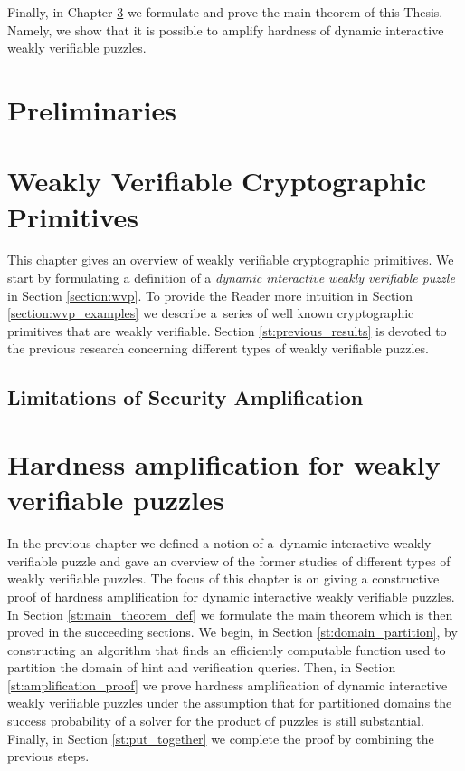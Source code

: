 \documentclass[11pt,a4paper,titlepage]{memoir}
\begin{document}
Finally, in Chapter \ref{ch:main_result} we formulate and prove the main theorem of this Thesis.
Namely, we show that it is possible to amplify hardness of dynamic interactive weakly verifiable puzzles.
%
\chapter{Preliminaries}
\label{ch:preliminaries}


\chapter{Weakly Verifiable Cryptographic Primitives}
\label{ch:intro_weakly}
This chapter gives an overview of weakly verifiable cryptographic primitives.
We start by formulating a definition of a \textit{dynamic interactive weakly verifiable puzzle} in Section \ref{section:wvp}.
To provide the Reader more intuition in Section \ref{section:wvp_examples} we describe a~series of well known cryptographic primitives
that are weakly verifiable. Section \ref{st:previous_results} is devoted to the previous research concerning different types of weakly verifiable puzzles.
%



%
\section{Limitations of Security Amplification}
%
\chapter{Hardness amplification for weakly verifiable puzzles}
\label{ch:main_result}
In the previous chapter we defined a notion of a~dynamic interactive weakly verifiable puzzle
and gave an overview of the former studies of different types of weakly verifiable puzzles.
The focus of this chapter is on giving a constructive proof of hardness amplification for dynamic interactive weakly verifiable puzzles.
In Section \ref{st:main_theorem_def} we formulate the main theorem which is then proved in the succeeding sections.
We begin, in Section \ref{st:domain_partition}, by constructing an algorithm that finds an efficiently computable function used
to partition the domain of hint and verification queries. Then, in Section \ref{st:amplification_proof} we prove
hardness amplification of dynamic interactive weakly verifiable puzzles under the assumption that for partitioned domains
the success probability of a solver for the product of puzzles is still substantial.
Finally, in Section \ref{st:put_together} we complete the proof by combining the previous steps.
%

%

%

%

%
\end{document}

